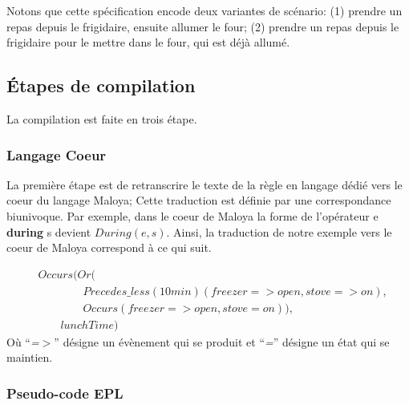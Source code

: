 Notons que cette spécification encode deux variantes de scénario: (1) prendre un repas depuis le frigidaire, ensuite allumer le four; (2) prendre un repas depuis le frigidaire pour le mettre dans le four, qui est déjà allumé.

\subsection{Étapes de compilation}\label{dsl:compilation}
La compilation est faite en trois étape. 

\subsubsection{Langage Coeur}

La première étape est de retranscrire le texte de la règle en langage dédié vers le coeur du langage Maloya; Cette traduction est définie par une correspondance biunivoque.
Par exemple, dans le coeur de Maloya la forme de l'opérateur {\ttfamily e {\bf during} s} devient $During(e,s)$. 
Ainsi, la traduction de notre exemple vers le coeur de Maloya correspond à ce qui suit.

\mathleft
\footnotesize
\begin{equation*}
  \begin{split}
&Occurs(Or(\\
&\quad\quad\quad\quad Precedes\_less(10min)(freezer => open, stove => on), \\
&\quad\quad\quad\quad Occurs(freezer => open, stove = on)), \\
&\quad\quad lunchTime)
  \end{split}
\end{equation*}
\normalsize
\noindent
Où ``{\em =$>$}'' désigne un évènement qui se produit et ``{\em =}'' désigne un état qui se maintien.

\subsubsection{Pseudo-code EPL}

